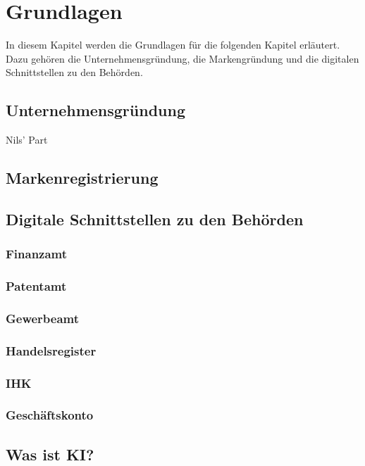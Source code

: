 \newpage

\section{Grundlagen} \label{grundlagen}
In diesem Kapitel werden die Grundlagen für die folgenden Kapitel erläutert. Dazu gehören die Unternehmensgründung, die Markengründung und die digitalen Schnittstellen zu den Behörden.


\subsection{Unternehmensgründung} \label{unternehmensgruendung}

Nils' Part
\subsection{Markenregistrierung} \label{markenregistrierung}


\subsection{Digitale Schnittstellen zu den Behörden} \label{digitaleBehoerden}

\subsubsection{Finanzamt} \label{finanzamt}

\subsubsection{Patentamt} \label{patentamt}

\subsubsection{Gewerbeamt} \label{gewerbeamt}

\subsubsection{Handelsregister} \label{handelsregister}

\subsubsection{IHK} \label{ihk}

\subsubsection{Geschäftskonto} \label{geschaeftskonto}


\subsection{Was ist KI?} \label{wasIstKI}

